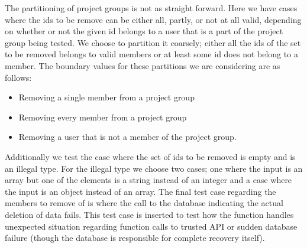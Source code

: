 The partitioning of project groups is not as straight forward.
Here we have cases where the ids to be remove can be either all, partly, or not at all valid, depending on whether or not the given id belongs to a user that is a part of the project group being tested.
We choose to partition it coarsely; either all the ids of the set to be removed belongs to valid members or at least some id does not belong to a member.
The boundary values for these partitions we are considering are as follows: 
\begin{itemize}
	\item Removing a single member from a project group
	\item Removing every member from a project group
	\item Removing a user that is not a member of the project group.
\end{itemize}
Additionally we test the case where the set of ids to be removed is empty and is an illegal type.
For the illegal type we choose two cases; one where the input is an array but one of the elements is a string instead of an integer and a case where the input is an object instead of an array.
The final test case regarding the members to remove of  is where the call to the database indicating the actual deletion of data fails.
This test case is inserted to test how the function handles unexpected situation regarding function calls to trusted API or sudden database failure (though the database is responsible for complete recovery itself).

